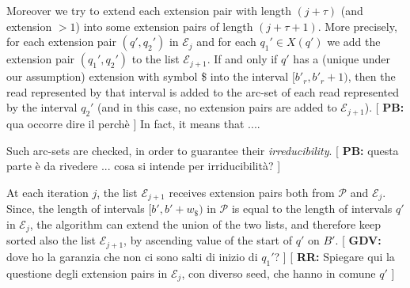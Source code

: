 \documentclass[runningheads,envcountsame,a4paper]{llncs}
\newcommand{\notaestesa}[2]{%
 \marginpar{\color{red!75!black}\textbf{\texttimes}}%
 {\color{red!75!black}%
 [\,\textbullet\,\textsf{\textbf{#1:}} %
 \textsf{\footnotesize#2}\,\textbullet\,]}%
}
\newcommand{\ie}{\textit{i.e.}\xspace}
\begin{document}
Moreover we try to extend each extension pair with length $(j+\tau)$ (and extension $>1$) into some 
extension pairs of length $(j+\tau+1)$.
More precisely, for each extension pair $(q', q_{2}')$ in  $\mathcal{E}_j$ and
for each $q_{1}'\in X(q')$ we add the extension pair  $(q_{1}',q_{2}')$ to
the list $\mathcal{E}_{j+1}$.
If and only if $q'$ has a (unique under our assumption) extension with symbol \$
into the interval $[b'_r, b'_r+1)$, then the read represented by that
interval is added to the arc-set of each read represented by the
interval $q_{2}'$ (and in this case, no extension pairs are added to $\mathcal{E}_{j+1}$).
\notaestesa{PB}{qua occorre dire il perchè} In fact, it means that ....

Such arc-sets are checked, in order to guarantee their
\emph{irreducibility}.
\notaestesa{PB}{questa parte è da rivedere ... cosa si intende per
  irriducibilità?}

At each iteration $j$, the list $\mathcal{E}_{j+1}$ receives extension
pairs both from $\mathcal{P}$ and $\mathcal{E}_{j}$.
Since, the length of intervals $[b', b'+w_\$)$ in $\mathcal{P}$ is
equal to the length of intervals $q'$ in $\mathcal{E}_{j}$, the
algorithm can extend the union of the two lists, and therefore keep
sorted also the list $\mathcal{E}_{j+1}$, by ascending value of the
start of $q'$ on $B'$.\notaestesa{GDV}{ dove ho la
  garanzia che non ci sono salti di inizio di $q_{1}'$?} \notaestesa{RR}{Spiegare qui la questione degli extension pairs in $\mathcal{E}_j$, con diverso seed, che hanno in comune $q'$}




\end{document}
